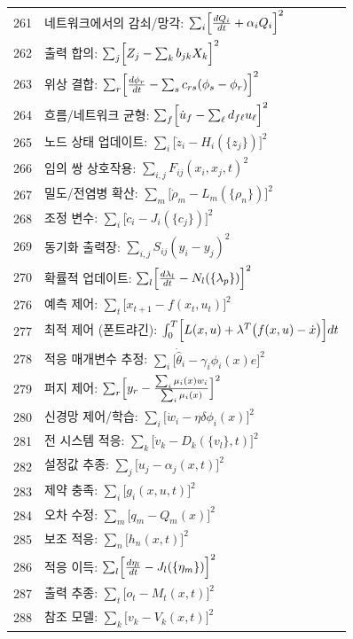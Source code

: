 \documentclass[11pt,a4paper]{article}
\begin{document}
\begin{longtable}{r l}
		261 & 네트워크에서의 감쇠/망각: $\sum_i\Bigl[\frac{dQ_i}{dt} + \alpha_i Q_i\Bigr]^2$ \\
		262 & 출력 합의: $\sum_j\Bigl[Z_j - \sum_k b_{jk}X_k\Bigr]^2$ \\
		263 & 위상 결합: $\sum_r\Bigl[\frac{d\phi_r}{dt} - \sum_s c_{rs}(\phi_s-\phi_r)\Bigr]^2$ \\
		264 & 흐름/네트워크 균형: $\sum_f\Bigl[\dot u_f - \sum_\ell d_{f\ell}u_\ell\Bigr]^2$ \\
		265 & 노드 상태 업데이트: $\sum_i\bigl[\dot z_i - H_i(\{z_j\})\bigr]^2$ \\
		266 & 임의 쌍 상호작용: $\sum_{i,j}F_{ij}(x_i,x_j,t)^2$ \\
		267 & 밀도/전염병 확산: $\sum_m\bigl[\dot\rho_m - L_m(\{\rho_n\})\bigr]^2$ \\
		268 & 조정 변수: $\sum_i\bigl[\dot c_i - J_i(\{c_j\})\bigr]^2$ \\
		269 & 동기화 출력장: $\sum_{i,j}S_{ij}(y_i-y_j)^2$ \\
		270 & 확률적 업데이트: $\sum_l\Bigl[\frac{d\lambda_l}{dt} - N_l(\{\lambda_p\})\Bigr]^2$ \\
		276 & 예측 제어: $\sum_t\bigl[x_{t+1} - f(x_t,u_t)\bigr]^2$ \\
		277 & 최적 제어 (폰트랴긴): $\int_0^T\Bigl[L(x,u) + \lambda^T\bigl(f(x,u)-\dot x\bigr)\Bigr]dt$ \\
		278 & 적응 매개변수 추정: $\sum_i\bigl[\dot{\hat{\theta}}_i - \gamma_i\phi_i(x)e\bigr]^2$ \\
		279 & 퍼지 제어: $\sum_r\Bigl[y_r - \frac{\sum_i\mu_i(x)w_i}{\sum_i\mu_i(x)}\Bigr]^2$ \\
		280 & 신경망 제어/학습: $\sum_i\bigl[\dot w_i - \eta\delta\phi_i(x)\bigr]^2$ \\
		281 & 전 시스템 적응: $\sum_k\bigl[\dot v_k - D_k(\{v_l\},t)\Bigr]^2$ \\
		282 & 설정값 추종: $\sum_j\bigl[u_j - \alpha_j(x,t)\Bigr]^2$ \\
		283 & 제약 충족: $\sum_i\bigl[g_i(x,u,t)\bigr]^2$ \\
		284 & 오차 수정: $\sum_m\bigl[q_m - Q_m(x)\bigr]^2$ \\
		285 & 보조 적응: $\sum_n\bigl[h_n(x,t)\bigr]^2$ \\
		286 & 적응 이득: $\sum_l\Bigl[\frac{d\eta_l}{dt} - J_l(\{\eta_m\})\Bigr]^2$ \\
		287 & 출력 추종: $\sum_t\bigl[o_t - M_t(x,t)\Bigr]^2$ \\
		288 & 참조 모델: $\sum_k\bigl[v_k - V_k(x,t)\bigr]^2$ \\

\end{longtable}
\end{document}
